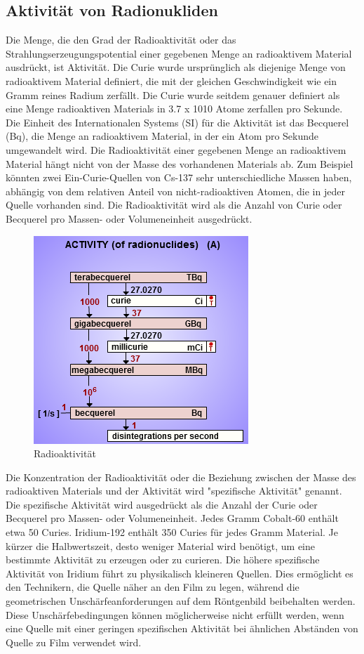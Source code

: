 \subsection{Aktivität von Radionukliden}
Die Menge, die den Grad der Radioaktivität oder das Strahlungserzeugungspotential einer gegebenen Menge an radioaktivem Material ausdrückt, ist Aktivität.
Die Curie wurde ursprünglich als diejenige Menge von radioaktivem Material definiert, die mit der gleichen Geschwindigkeit wie ein Gramm reines Radium zerfällt.
Die Curie wurde seitdem genauer definiert als eine Menge radioaktiven Materials in
3.7 x 1010 Atome zerfallen pro Sekunde. Die Einheit des Internationalen Systems (SI) für die Aktivität ist das Becquerel (Bq), die Menge an radioaktivem Material, in der ein Atom pro Sekunde umgewandelt wird.
Die Radioaktivität einer gegebenen Menge an radioaktivem Material hängt nicht von der Masse des vorhandenen Materials ab.
Zum Beispiel könnten zwei Ein-Curie-Quellen von Cs-137 sehr unterschiedliche Massen haben, abhängig von dem relativen Anteil von nicht-radioaktiven Atomen, die in jeder Quelle vorhanden sind. Die Radioaktivität wird als die Anzahl von Curie oder Becquerel pro Massen- oder Volumeneinheit ausgedrückt.
\begin{figure}[htb]
  \centering  
  \includegraphics[scale=0.9]{img/activity.png}
  \caption{Radioaktivität}
  \label{fig:activity}
\end{figure}
Die Konzentration der Radioaktivität oder die Beziehung zwischen der Masse des radioaktiven Materials und der Aktivität wird "spezifische Aktivität" genannt. Die spezifische Aktivität wird ausgedrückt als die Anzahl der Curie oder Becquerel pro Massen- oder Volumeneinheit. Jedes Gramm Cobalt-60 enthält etwa 50 Curies. Iridium-192 enthält 350 Curies für jedes Gramm Material.
Je kürzer die Halbwertszeit, desto weniger Material wird benötigt, um eine bestimmte Aktivität zu erzeugen oder zu curieren.
Die höhere spezifische Aktivität von Iridium führt zu physikalisch kleineren Quellen. Dies ermöglicht es den Technikern, die Quelle näher an den Film zu legen, während die geometrischen Unschärfeanforderungen auf dem Röntgenbild beibehalten werden.
Diese Unschärfebedingungen können möglicherweise nicht erfüllt werden, wenn eine Quelle mit einer geringen spezifischen Aktivität bei ähnlichen Abständen von Quelle zu Film verwendet wird.
